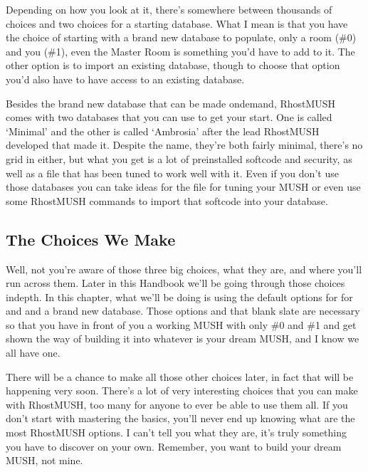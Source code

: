 \documentclass[letterpaper,10pt,english]{sphinxmanual}
\begin{document}
\sphinxAtStartPar
Depending on how you look at it, there’s somewhere between thousands of choices
and two choices for a starting database. What I mean is that you have the
choice of starting with a brand new database to populate, only a room (\#0) and
you (\#1), even the Master Room is something you’d have to add to it. The other
option is to import an existing database, though to choose that option you’d
also have to have access to an existing database.

\sphinxAtStartPar
Besides the brand new database that can be made on\sphinxhyphen{}demand, RhostMUSH comes with
two databases that you can use to get your start. One is called ‘Minimal’ and
the other is called ‘Ambrosia’ after the lead RhostMUSH developed that made it.
Despite the name, they’re both fairly minimal, there’s no grid in either, but
what you get is a lot of pre\sphinxhyphen{}installed softcode and security, as well as a
 file that has been tuned to work well with it. Even if you
don’t use those databases you can take ideas for the  file for
tuning your MUSH or even use some RhostMUSH commands to import that softcode
into your database.


\subsection{The Choices We Make}
\label{\detokenize{install:the-choices-we-make}}
\sphinxAtStartPar
Well, not you’re aware of those three big choices, what they are, and where
you’ll run across them. Later in this Handbook we’ll be going through those
choices in\sphinxhyphen{}depth. In this chapter, what we’ll be doing is using the default
options for for  and  and a brand new database.
Those options and that blank slate are necessary so that you have in front of
you a working MUSH with only \#0 and \#1 and get shown the way of building it
into whatever is your dream MUSH, and I know we all have one.

\sphinxAtStartPar
There will be a chance to make all those other choices later, in fact that
will be happening very soon. There’s a lot of very interesting choices that
you can make with RhostMUSH, too many for anyone to ever be able to use them
all. If you don’t start with mastering the basics, you’ll never end up knowing
what are the most RhostMUSH options. I can’t tell you what they are, it’s truly
something you have to discover on your own. Remember, you want to build your
dream MUSH, not mine.
\end{document}
